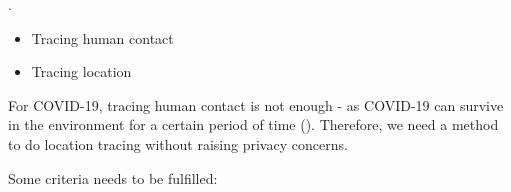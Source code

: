   \par {}.

    \begin{itemize}
      \item Tracing human contact
      \item Tracing location
    \end{itemize}

    \par For COVID-19, tracing human contact is not enough - as COVID-19 can survive in the environment for a certain period of time (). Therefore, we need a method to do location tracing without raising privacy concerns.

    \par Some criteria needs to be fulfilled:
